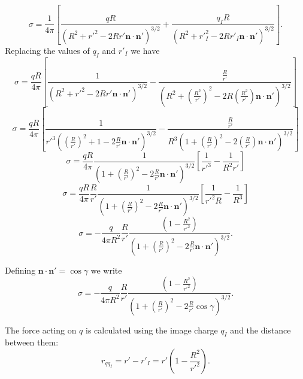\begin{equation}
 \sigma =  \frac{1}{4 \pi } \left[  \frac{q R }{\left(R^2 + r'^2 - 2 Rr' \textbf{n} \cdot \textbf{n}' \right)^{3/2} } + \frac{q_I R }{\left(R^2 + r'^2_I - 2 Rr'_I \textbf{n} \cdot \textbf{n}' \right)^{3/2}} \right].  
 \end{equation} 
Replacing the values of $q_I$ and $r'_I$ we have
\begin{equation}
 \sigma =  \frac{qR}{4 \pi } \left[  \frac{ 1 }{\left(R^2 + r'^2 - 2 Rr' \textbf{n} \cdot \textbf{n}' \right)^{3/2} } - \frac{\frac{R}{r'}  }{\left(R^2 + \left( \frac{R^2}{r'} \right)^2 - 2 R \left( \frac{R^2}{r'} \right)  \textbf{n} \cdot \textbf{n}' \right)^{3/2}} \right]  
 \end{equation} 
\begin{equation}
 \sigma =  \frac{qR}{4 \pi } \left[  \frac{ 1 }{r'^3 \left(\left(\frac{R}{r'}\right)^2 + 1 - 2 \frac{R}{r'} \textbf{n} \cdot \textbf{n}' \right)^{3/2} } - \frac{\frac{R}{r'}  }{R^3 \left(1 + \left( \frac{R}{r'} \right)^2 - 2  \left( \frac{R}{r'} \right)  \textbf{n} \cdot \textbf{n}' \right)^{3/2}} \right]
 \end{equation} 
\begin{equation}
 \sigma =  \frac{qR}{4 \pi } \frac{ 1 }{ \left( 1+ \left(\frac{R}{r'}\right)^2 - 2 \frac{R}{r'} \textbf{n} \cdot \textbf{n}' \right)^{3/2} } \left[  \frac{ 1 }{r'^3 } - \frac{1 }{R^2 r'} \right]  
 \end{equation} 
 \begin{equation}
 \sigma =  \frac{qR}{4 \pi } \frac{R}{r'} \frac{ 1 }{ \left( 1+ \left(\frac{R}{r'}\right)^2 - 2 \frac{R}{r'} \textbf{n} \cdot \textbf{n}' \right)^{3/2} } \left[  \frac{ 1 }{r'^2 R } - \frac{1 }{R^3} \right] 
 \end{equation} 
  \begin{equation}
 \sigma = - \frac{q}{4 \pi R^2 } \frac{R}{r'} \frac{ \left(  1- \frac{ R^2}{r'^2  }  \right) }{ \left( 1+ \left(\frac{R}{r'}\right)^2 - 2 \frac{R}{r'} \textbf{n} \cdot \textbf{n}' \right)^{3/2} } .  
 \end{equation} 
 
Defining $\textbf{n} \cdot \textbf{n}' = \cos \gamma$ we write
  \begin{equation}
 \sigma = - \frac{q}{4 \pi R^2 } \frac{R}{r'} \frac{ \left(  1- \frac{ R^2}{r'^2  }  \right) }{ \left( 1+ \left(\frac{R}{r'}\right)^2 - 2 \frac{R}{r'} \cos \gamma \right)^{3/2} } .  
 \end{equation} 

The force acting on $q$ is calculated using the image charge $q_I$ and the distance between them: 
\begin{equation}
r_{qq_I} = r' - r'_I = r' \left( 1 - \frac{R^2}{r'^2}\right).
\end{equation}

